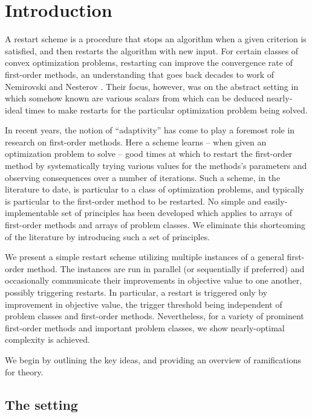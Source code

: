 \documentclass[reqno, 11pt]{amsart}
\numberwithin{equation}{section}
\begin{document}
\section{{\bf  Introduction}}  \label{sect.a}


A restart scheme is a procedure that stops an algorithm when a given criterion is satisfied, and then restarts the algorithm with new input.  For certain classes of convex optimization problems, restarting can improve the convergence rate of first-order methods, an understanding that goes back decades to work of Nemirovski and Nesterov \cite{NemNes85}. Their focus, however, was on the abstract setting in which somehow known are various scalars from which can be deduced nearly-ideal times to make restarts for the particular optimization problem being solved. 

In recent years, the notion of ``adaptivity'' has come to play a foremost role in research on first-order methods. Here a scheme learns -- when given an optimization problem to solve -- good times at which to restart the first-order method by systematically trying various values for the methods's parameters and observing consequences over a number of iterations.  Such a scheme, in the literature to date, is particular to a class of optimization problems, and typically is particular to the first-order method to be restarted. No simple and easily-implementable set of principles has been developed which applies to arrays of first-order methods and arrays of problem classes. We eliminate this shortcoming of the literature by introducing such a set of principles.
 
We present a simple restart scheme utilizing multiple instances of a general first-order method. The instances are run in parallel (or sequentially if preferred) and occasionally communicate their improvements in objective value to one another, possibly triggering restarts. In particular, a restart is triggered only by improvement in objective value, the trigger threshold being independent of problem classes and first-order methods. Nevertheless, for a variety of prominent first-order methods and important problem classes, we show nearly-optimal complexity is achieved.

We begin by outlining the key ideas, and providing an overview of ramifications for theory.  

\subsection{The setting}  \label{sect.aa}
\end{document}
